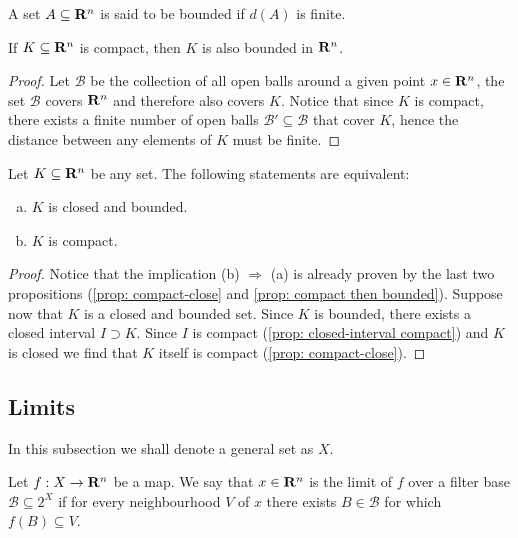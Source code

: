 \begin{definition}\label{def: bounded}
A set \(A \subseteq \mathbf{R}^n\) is said to be bounded if \(d(A)\) is finite.
\end{definition}

\begin{proposition}\label{prop: compact then bounded}
If \(K \subseteq \mathbf{R}^n\) is compact, then \(K\) is also bounded in \(\mathbf{R}^n\).
\end{proposition}

\begin{proof}
Let \(\mathcal B\) be the collection of all open balls around a given point
\(x \in \mathbf{R}^n\), the set \(\mathcal B\) covers \(\mathbf{R}^n\) and therefore also
covers \(K\). Notice that since \(K\) is compact, there exists a finite number
of open balls \(\mathcal B' \subseteq \mathcal B\) that cover \(K\), hence the
distance between any elements of \(K\) must be finite.
\end{proof}

\begin{theorem}\label{heine-borel}
Let \(K \subseteq \mathbf{R}^n\) be any set. The following statements are equivalent:
\begin{enumerate}[(a)]
\item \(K\) is closed and bounded.
\item \(K\) is compact.
\end{enumerate}
\end{theorem}

\begin{proof}
Notice that the implication (b) \(\Rightarrow\) (a) is already proven by the
last two propositions (\cref{prop: compact-close} and \cref{prop: compact then
bounded}). Suppose now that \(K\) is a closed and bounded set. Since \(K\) is
bounded, there exists a closed interval \(I \supset K\). Since \(I\) is
compact (\cref{prop: closed-interval compact}) and \(K\) is closed we find
that \(K\) itself is compact (\cref{prop: compact-close}).
\end{proof}

\subsection{Limits}

\begin{remark}
In this subsection we shall denote a general set as \(X\).
\end{remark}

\begin{definition}[Limit]\label{def: limit-several}
Let \(f: X \to \mathbf{R}^n\) be a map. We say that \(x \in \mathbf{R}^n\) is the limit of
\(f\) over a filter base \(\mathcal B \subseteq  2^X\) if for every
neighbourhood \(V\) of \(x\) there exists \(B \in \mathcal B\) for which
\(f(B) \subseteq V\).
\end{definition}

